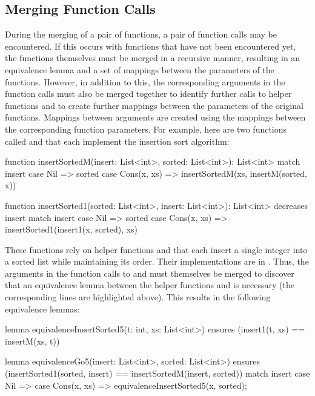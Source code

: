 \subsection{Merging Function Calls}\label{sec:merging-calls}
During the merging of a pair of functions, a pair of function calls may be encountered. If this occurs with functions that have not been encountered yet, the functions themselves must be merged in a recursive manner, resulting in an equivalence lemma and a set of mappings between the parameters of the functions. However, in addition to this, the corresponding arguments in the function calls must also be merged together to identify further calls to helper functions and to create further mappings between the parameters of the original functions. Mappings between arguments are created using the mappings between the corresponding function parameters. For example, here are two functions called  and  that each implement the insertion sort algorithm:
\begin{dafny}[highlightlines={5,14}]
function insertSortedM(insert: List<int>, sorted: List<int>): List<int>
  {
  match insert {
    case Nil => sorted
    case Cons(x, xs) => insertSortedM(xs, insertM(sorted, x))
  }
}

function insertSorted1(sorted: List<int>, insert: List<int>): List<int>
  decreases insert
 {
  match insert {
    case Nil => sorted
    case Cons(x, xs) => insertSorted1(insert1(x, sorted), xs)
  }
}
\end{dafny}
%
These functions rely on helper functions  and  that each insert a single integer into a sorted list while maintaining its order. Their implementations are in . Thus, the arguments in the function calls to  and  must themselves be merged to discover that an equivalence lemma between the helper functions  and  is necessary (the corresponding lines are highlighted above). This results in the following equivalence lemmas:

\begin{dafny}
lemma equivalenceInsertSorted5(t: int, xs: List<int>)
  ensures (insert1(t, xs) == insertM(xs, t))
{}

lemma equivalenceGo5(insert: List<int>, sorted: List<int>)
  ensures (insertSorted1(sorted, insert) == insertSortedM(insert, sorted))
{
    match insert {
        case Nil => {}
        case Cons(x, xs) => equivalenceInsertSorted5(x, sorted);
    }
}
\end{dafny}
% 

